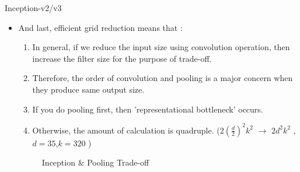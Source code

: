 \documentclass{beamer}
\begin{document}
\begin{frame}{Inception-v2/v3}
	\begin{itemize}
		\item And last, efficient grid reduction means that :
		\begin{enumerate}
			\item In general, if we reduce the input size using convolution operation, then increase the filter size for the purpose of trade-off.
			\item Therefore, the order of convolution and pooling is a major concern when they produce same output size.
			\item If you do pooling first, then 'representational bottleneck' occurs.
			\item Otherwise, the amount of calculation is quadruple. ($2(\frac{d}{2})^2 k^2$ $\rightarrow$ $2d^2 k^2$ , $d=35$,$k=320$ ) 
		\end{enumerate}
		\begin{figure}[h]		
			\centering
			\quad
			\caption{Inception \& Pooling Trade-off}
			\label{poolinginception}
		\end{figure}
	\end{itemize}
\end{frame}	
	
\end{document}
